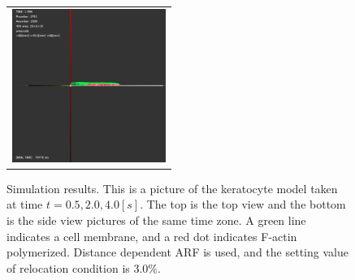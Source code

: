 \documentclass[a4paper,12pt]{book}
\begin{document}
\begin{figure}[h]
{\begin{tabular}{c}
   \includegraphics[width=5cm]{side20_arf.eps}
  \end{tabular}
 }%
 \caption{Simulation results. This is a picture of the keratocyte model taken at time $t = 0.5, 2.0, 4.0 [s]$. The top is the top view and the bottom is the side view pictures of the same time zone. A green line indicates a cell membrane, and a red dot indicates F-actin polymerized. Distance dependent ARF is used, and the setting value of relocation condition is 3.0\%.}
 \label{fig:res0}
\end{figure}
\end{document}
